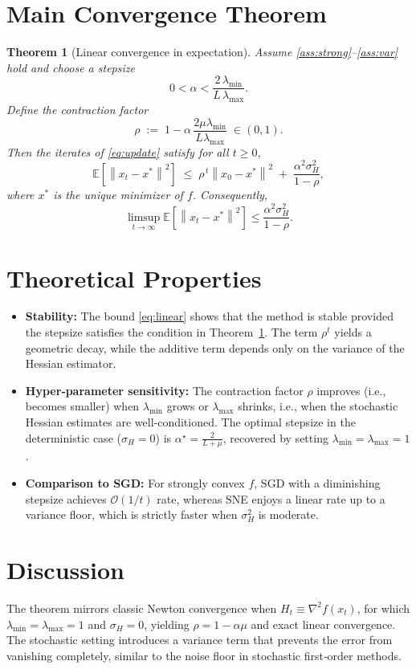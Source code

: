 \documentclass[11pt]{article}
\newtheorem{theorem}{Theorem}
\newcommand{\E}{\mathbb{E}}
\newcommand{\norm}[1]{\left\|#1\right\|}
\begin{document}
\section*{Main Convergence Theorem}
\begin{theorem}[Linear convergence in expectation]\label{thm:linear}
Assume \ref{ass:strong}–\ref{ass:var} hold and choose a stepsize
\[
0<\alpha<\frac{2\,\lambda_{\min}}{L\,\lambda_{\max}}.
\]
Define the contraction factor
\[
\rho \;:=\; 1-\alpha\,\frac{2\mu\lambda_{\min}}{L\lambda_{\max}} \;\in (0,1).
\]
Then the iterates of \eqref{eq:update} satisfy for all $t\ge 0$,
\begin{equation}\label{eq:linear}
\E\!\left[\norm{x_{t}-x^{*}}^{2}\right]\;\le\; \rho^{\,t}\norm{x_{0}-x^{*}}^{2}
\;+\;\frac{\alpha^{2}\sigma_{H}^{2}}{1-\rho},
\end{equation}
where $x^{*}$ is the unique minimizer of $f$.
Consequently,
\[
\limsup_{t\to\infty}\E\!\left[\norm{x_{t}-x^{*}}^{2}\right]\le \frac{\alpha^{2}\sigma_{H}^{2}}{1-\rho}.
\]
\end{theorem}

\section*{Theoretical Properties}
\begin{itemize}
\item \textbf{Stability:} The bound \eqref{eq:linear} shows that the method is stable provided the stepsize satisfies the condition in Theorem~\ref{thm:linear}. The term $\rho^{t}$ yields a geometric decay, while the additive term depends only on the variance of the Hessian estimator.
\item \textbf{Hyper‑parameter sensitivity:} The contraction factor $\rho$ improves (i.e., becomes smaller) when $\lambda_{\min}$ grows or $\lambda_{\max}$ shrinks, i.e., when the stochastic Hessian estimates are well‑conditioned. The optimal stepsize in the deterministic case ($\sigma_{H}=0$) is $\alpha^{\star}= \frac{2}{L+\mu}$, recovered by setting $\lambda_{\min}=\lambda_{\max}=1$.
\item \textbf{Comparison to SGD:} For strongly convex $f$, SGD with a diminishing stepsize achieves $\mathcal{O}(1/t)$ rate, whereas SNE enjoys a linear rate up to a variance floor, which is strictly faster when $\sigma_{H}^{2}$ is moderate.
\end{itemize}

\section*{Discussion}
The theorem mirrors classic Newton convergence when $H_{t}\equiv\nabla^{2}f(x_{t})$, for which $\lambda_{\min}=\lambda_{\max}=1$ and $\sigma_{H}=0$, yielding $\rho=1-\alpha\mu$ and exact linear convergence. The stochastic setting introduces a variance term that prevents the error from vanishing completely, similar to the noise floor in stochastic first‑order methods.
\end{document}
